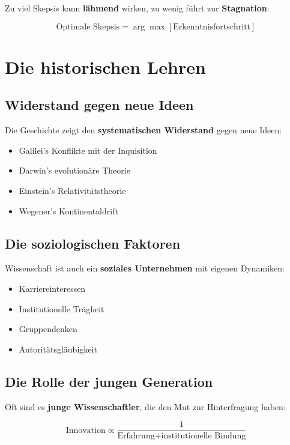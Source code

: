 \documentclass[12pt,a4paper]{report}
\begin{document}
	Zu viel Skepsis kann \textbf{lähmend} wirken, zu wenig führt zur \textbf{Stagnation}:
	
	\begin{equation}
		\text{Optimale Skepsis} = \arg\max[\text{Erkenntnisfortschritt}]
	\end{equation}
	
	\section{Die historischen Lehren}
	
	\subsection{Widerstand gegen neue Ideen}
	
	Die Geschichte zeigt den \textbf{systematischen Widerstand} gegen neue Ideen:
	
	\begin{itemize}
		\item Galilei's Konflikte mit der Inquisition
		\item Darwin's evolutionäre Theorie
		\item Einstein's Relativitätstheorie
		\item Wegener's Kontinentaldrift
	\end{itemize}
	
	\subsection{Die soziologischen Faktoren}
	
	Wissenschaft ist auch ein \textbf{soziales Unternehmen} mit eigenen Dynamiken:
	
	\begin{itemize}
		\item Karriereinteressen
		\item Institutionelle Trägheit
		\item Gruppendenken
		\item Autoritätsgläubigkeit
	\end{itemize}
	
	\subsection{Die Rolle der jungen Generation}
	
	Oft sind es \textbf{junge Wissenschaftler}, die den Mut zur Hinterfragung haben:
	
	\begin{equation}
		\text{Innovation} \propto \frac{1}{\text{Erfahrung} + \text{institutionelle Bindung}}
	\end{equation}
	
\end{document}
